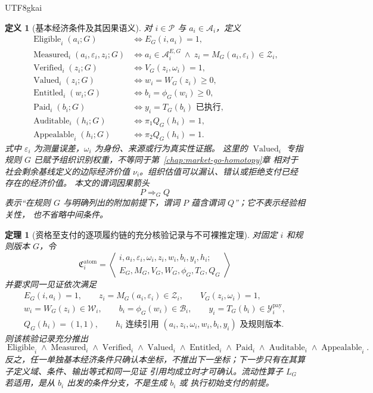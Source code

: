 \documentclass[12pt,a4paper,openany]{report}
\newtheorem{definition}{定义}[chapter]
\newtheorem{theorem}{定理}[chapter]
\newcommand{\Part}{\mathcal P}
\newcommand{\Act}{\mathcal A}
\DeclareMathOperator{\Eligible}{Eligible}
\DeclareMathOperator{\Measured}{Measured}
\DeclareMathOperator{\Verified}{Verified}
\DeclareMathOperator{\Valued}{Valued}
\DeclareMathOperator{\Entitled}{Entitled}
\DeclareMathOperator{\Paid}{Paid}
\DeclareMathOperator{\Auditable}{Auditable}
\DeclareMathOperator{\Appealable}{Appealable}
\begin{document}
\begin{CJK*}{UTF8}{gkai}
\begin{definition}[基本经济条件及其因果语义]
对 \(i\in\Part\) 与 \(a_i\in\Act_i\)，定义
\[
\begin{aligned}
  \Eligible_i(a_i;G)&\Longleftrightarrow E_G(i,a_i)=1,\\
  \Measured_i(a_i,\varepsilon_i,z_i;G)&\Longleftrightarrow
  a_i\in\Act_i^{E,G}\ \wedge\ z_i=M_G(a_i,\varepsilon_i)\in\mathcal Z_i,\\
  \Verified_i(z_i;G)&\Longleftrightarrow V_G(z_i,\omega_i)=1,\\
  \Valued_i(z_i;G)&\Longleftrightarrow w_i=W_G(z_i)\ge0,\\
  \Entitled_i(w_i;G)&\Longleftrightarrow b_i=\phi_G(w_i)\ge0,\\
  \Paid_i(b_i;G)&\Longleftrightarrow y_i=T_G(b_i)\text{ 已执行},\\
  \Auditable_i(h_i;G)&\Longleftrightarrow \pi_1Q_G(h_i)=1,\\
  \Appealable_i(h_i;G)&\Longleftrightarrow \pi_2Q_G(h_i)=1.
\end{aligned}
\]
式中 \(\varepsilon_i\) 为测量误差，\(\omega_i\) 为身份、来源或行为真实性证据。
这里的 \(\Valued_i\) 专指规则 \(G\) 已赋予组织识别权重，不等同于第~\ref{chap:market-go-homotopy}章
相对于社会剩余基线定义的边际经济价值 \(\nu_i\)。组织估值可以漏认、错认或拒绝支付已经存在的经济价值。
本文的谓词因果箭头
\[
  P\Longrightarrow_G Q
\]
表示“在规则 \(G\) 与明确列出的附加前提下，谓词 \(P\) 蕴含谓词 \(Q\)”；它不表示经验相关性，
也不省略中间条件。
\end{definition}

\begin{theorem}[资格至支付的逐项履约链的充分核验记录与不可裸推定理]
\label{thm:typed-atomic-execution-chain}
对固定 \(i\) 和规则版本 \(G\)，令
\[
  \mathfrak C_{i}^{\mathrm{atom}}
  =\left\langle
  \begin{gathered}
  i,a_i,\varepsilon_i,\omega_i,z_i,w_i,b_i,y_i,h_i;\\
  E_G,M_G,V_G,W_G,\phi_G,T_G,Q_G
  \end{gathered}
  \right\rangle
\]
并要求同一见证依次满足
\[
\begin{gathered}
  E_G(i,a_i)=1,
  \qquad z_i=M_G(a_i,\varepsilon_i)\in\mathcal Z_i,
  \qquad V_G(z_i,\omega_i)=1,\\
  w_i=W_G(z_i)\in\mathcal W_i,
  \qquad b_i=\phi_G(w_i)\in\mathcal B_i,
  \qquad y_i=T_G(b_i)\in\mathcal Y_i^{\mathrm{pay}},\\
  Q_G(h_i)=(1,1),
  \qquad
  h_i\text{ 连续引用 }(a_i,z_i,\omega_i,w_i,b_i,y_i)\text{ 及规则版本}.
\end{gathered}
\]
则该核验记录充分推出
\[
  \Eligible_i\wedge\Measured_i\wedge\Verified_i
  \wedge\Valued_i\wedge\Entitled_i\wedge\Paid_i
  \wedge\Auditable_i\wedge\Appealable_i.
\]
反之，任一单独基本经济条件只确认本坐标，不推出下一坐标；下一步只有在其算子定义域、条件、输出等式和同一见证
引用均成立时才可确认。流动性算子 \(L_G\) 若适用，是从 \(b_i\) 出发的条件分支，不是生成 \(b_i\) 或
执行初始支付的前提。
\end{theorem}


\end{CJK*}
\end{document}
